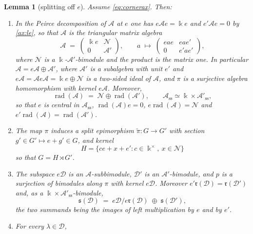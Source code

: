 \documentclass[12pt]{article}
\newtheorem{lemma}[lemma]{Lemma}
\theoremstyle{definition}
\newcommand{\topp}{\mathfrak{s}}
\newcommand{\rbm}{\mathfrak{r}}  %
\newcommand{\sms}{\operatorname{ss}}
\newcommand{\kk}{\Bbbk}
\newcommand{\alg}{\mathcal{A}}   %
\newcommand{\bmdl}{\mathcal{D}}   %
\newcommand{\rad}{\operatorname{rad}}
\begin{document}
\begin{lemma}[splitting off $e$]\label{lem:cornersplit}
Assume \eqref{eq:cornerax}. Then:
\begin{enumerate}
\item\label{cs:alg} In the Peirce decomposition of $\alg$ at $e$ one has
$e\alg e = \kk e$ and $e'\alg e = 0$ by \eqref{ax:le}, so that $\alg$ is
the triangular matrix algebra
\begin{equation}\label{eq:triangular}
   \alg \;=\;
   \begin{pmatrix} \kk e & \mathcal N\\ 0 & \alg'\end{pmatrix} ,
   \qquad
   a \;\longmapsto\;
   \begin{pmatrix} eae & eae'\\ 0 & e'ae'\end{pmatrix} ,
\end{equation}
where $\mathcal N$ is a $\kk$-$\alg'$-bimodule and the product is the matrix one.
In particular $\alg = e\alg\oplus\alg'$, where $\alg'$ is a
subalgebra with unit $e'$ and $e\alg = \alg e\alg = \kk e\oplus \mathcal N$ is a
two-sided ideal of $\alg$, and $\pi$ is a surjective algebra homomorphism with
kernel $e\alg$. Moreover,
\begin{equation}\label{eq:radsplit}
   \rad(\alg) \;=\; \mathcal N \oplus \rad(\alg'), \qquad
   \alg_{\sms}\simeq \kk\times \alg'_{\sms} ,
\end{equation}
so that $e$ is central in $\alg_{\sms}$, $\rad(\alg)e = 0$, $e\rad(\alg) = \mathcal N$ and $e'\rad(\alg) =
\rad(\alg')$.
\item\label{cs:group} The map $\pi$ induces a split epimorphism $\tilde\pi :
G \rightarrow G'$ with section $g'\in G'\mapsto e+g'
\in G$, and kernel
\begin{equation}\label{eq:Hdef}
   H = \{ce+x+e' : c \in \kk^\times,\ x \in \mathcal N\} 
\end{equation}
so that $G=H\rtimes G'$.
\item\label{cs:bim} The subspace $e\bmdl$ is an $\alg$-subbimodule, $\bmdl'$ is an
$\alg'$-bimodule, and $p$ is a surjection of bimodules along $\pi$ with
kernel $e\bmdl$. Moreover $e'\rbm(\bmdl) = \rbm(\bmdl')$ and, as a
$\kk\times\alg'_{\sms}$-bimodule,
\begin{equation}\label{eq:topsplit}
   \topp(\bmdl) \;=\; e\bmdl/e\rbm(\bmdl) \;\oplus\;\topp(\bmdl') ,
\end{equation}
the two summands being the images of left multiplication by $e$ and by $e'$.
\item\label{cs:gen} For every $\lambda\in\bmdl$,

\end{enumerate}
\end{lemma}
\end{document}
